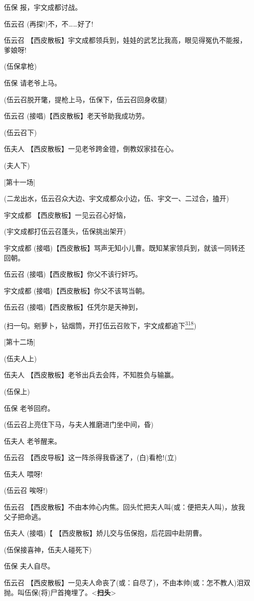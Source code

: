 伍保 报，宇文成都讨战。

伍云召 (再探!)不，不\ldots{}\ldots{}好了!

伍云召
【西皮散板】宇文成都领兵到，娃娃的武艺比我高，眼见得冤仇不能报，爹娘呀!

(伍保拿枪)

伍保 请老爷上马。

(伍云召脱开氅，提枪上马，伍保下，伍云召回身收腿)

伍云召 (接唱)【西皮散板】老天爷助我成功劳。

(伍云召下)

伍夫人 【西皮散板】一见老爷跨金镫，倒教奴家挂在心。

(夫人下)

{[}第十一场{]}

(二龙出水，伍云召众大边、宇文成都众小边，伍、宇文一、二过合，搕开)

宇文成都 【西皮散板】一见云召心好恼，

(宇文成都打伍云召蓬头，伍保挑出架开)

宇文成都
(接唱)【西皮散板】骂声无知小儿曹。既知某家领兵到，就该一同转还回朝。

伍云召 (接唱)【西皮散板】你父不该行奸巧。

宇文成都 (接唱)【西皮散板】你父不该骂当朝。

伍云召 (接唱)【西皮散板】任凭尔是天神到，

(扫一句。剜萝卜，钻烟筒，开打伍云召败下，宇文成都追下\protect\hyperlink{fn318}{\textsuperscript{318}})

{[}第十二场{]}

(伍夫人上)

伍夫人 【西皮散板】老爷出兵去会阵，不知胜负与输赢。

(伍保上)

伍保 老爷回府。

(伍云召上亮住下马，与夫人推磨进门坐中间，昏)

伍夫人 老爷醒来。

伍云召 【西皮导板】这一阵杀得我昏迷了，(白)看枪!(立)

伍夫人 喂呀!

(伍云召 唉呀!)

伍云召
【西皮散板】不由本帅心内焦。回头忙把夫人叫(或：便把夫人叫)，放我父子把命逃。

伍夫人 (接唱)【 【西皮散板】娇儿交与伍保抱，后花园中赴阴曹。

(伍保接喜神，伍夫人碰死下)

伍保 夫人自尽。

伍云召
【西皮散板】一见夫人命丧了(或：自尽了)，不由本帅(或：怎不教人)泪双抛。叫伍保(将)尸首掩埋了。\textless{}\textbf{扫头}\textgreater{}

